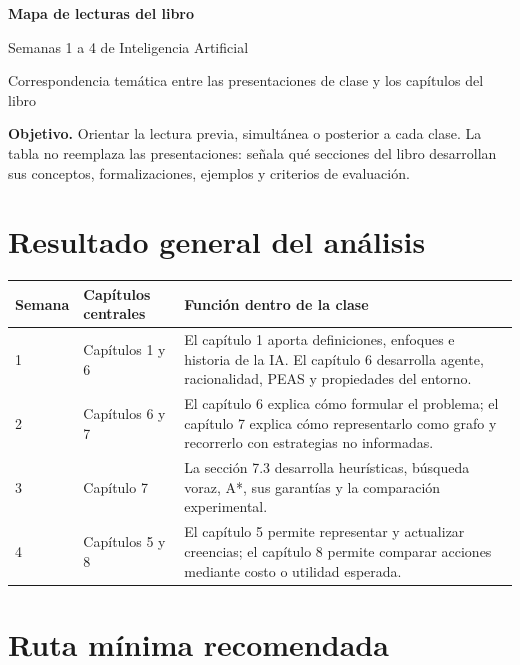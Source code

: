 \documentclass[10pt,a4paper]{article}
\begin{document}
\begin{center}
  {\color{UAPNavy}\LARGE\bfseries Mapa de lecturas del libro}\par
  \vspace{2pt}
  {\color{UAPTeal}\Large Semanas 1 a 4 de Inteligencia Artificial}\par
  \vspace{5pt}
  {\color{UAPGray}\small Correspondencia temática entre las presentaciones de clase y los capítulos del libro}
\end{center}

\vspace{4pt}
\noindent\colorbox{UAPLight}{%
  \parbox{\dimexpr\textwidth-2\fboxsep-4pt\relax}{
    \textbf{Objetivo.} Orientar la lectura previa, simultánea o posterior a cada clase. La tabla no reemplaza las presentaciones: señala qué secciones del libro desarrollan sus conceptos, formalizaciones, ejemplos y criterios de evaluación.
  }
}\par

\section*{Resultado general del análisis}

\begin{longtable}{P{1.45cm}P{4.55cm}P{8.25cm}}
\toprule
{}
\color{white}\textbf{Semana} & \color{white}\textbf{Capítulos centrales} & \color{white}\textbf{Función dentro de la clase} \\
 & Capítulos 1 y 6 & El capítulo 1 aporta definiciones, enfoques e historia de la IA. El capítulo 6 desarrolla agente, racionalidad, PEAS y propiedades del entorno. \\
2 & Capítulos 6 y 7 & El capítulo 6 explica cómo formular el problema; el capítulo 7 explica cómo representarlo como grafo y recorrerlo con estrategias no informadas. \\
3 & Capítulo 7 & La sección 7.3 desarrolla heurísticas, búsqueda voraz, A*, sus garantías y la comparación experimental. \\
4 & Capítulos 5 y 8 & El capítulo 5 permite representar y actualizar creencias; el capítulo 8 permite comparar acciones mediante costo o utilidad esperada. \\
\bottomrule
\end{longtable}

\section*{Ruta mínima recomendada}
\end{document}
